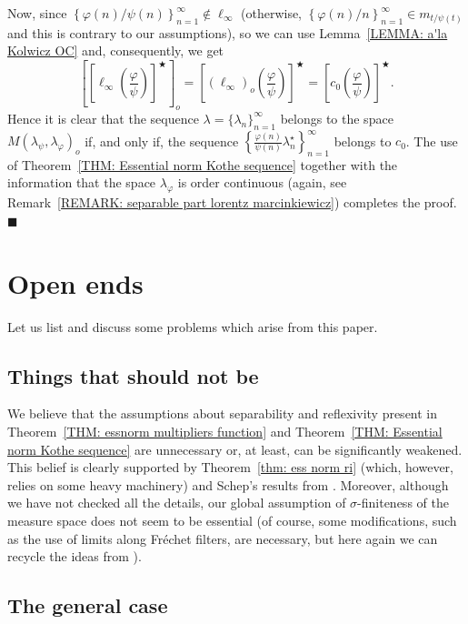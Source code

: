 \documentclass[11pt]{amsart}
\theoremstyle{definition}
\theoremstyle{definition}
\theoremstyle{definition}
\theoremstyle{definition}
\theoremstyle{definition}
\theoremstyle{definition}
\theoremstyle{definition}
\theoremstyle{definition}
\numberwithin{equation}{section}
\numberwithin{equation}{section}
\numberwithin{equation}{section}
\theoremstyle{definition}
\theoremstyle{definition}
\theoremstyle{definition}
\theoremstyle{definition}
\theoremstyle{definition}
\theoremstyle{definition}
\begin{document}
		Now, since $\left\{ \varphi(n)/\psi(n) \right\}_{n=1}^{\infty} \notin \ell_{\infty}$
		(otherwise, $\left\{ \varphi(n)/n \right\}_{n=1}^{\infty} \in m_{t/\psi(t)}$ and this is contrary to our assumptions),
		so we can use Lemma~\ref{LEMMA: a'la Kolwicz OC} and, consequently, we get
		\begin{equation*}
			\left[ \left[ \ell_{\infty}\left( \frac{\varphi}{\psi} \right) \right]^{\bigstar} \right]_o
				= \left[ (\ell_{\infty})_o \left( \frac{\varphi}{\psi} \right) \right]^{\bigstar}
				= \left[ c_0 \left( \frac{\varphi}{\psi} \right) \right]^{\bigstar}.
		\end{equation*}
		Hence it is clear that the sequence $\lambda = \{\lambda_n\}_{n=1}^{\infty}$ belongs to the space $M(\lambda_{\psi}, \lambda_{\varphi})_o$ if, and only if,
		the sequence $\left\{ \frac{\varphi(n)}{\psi(n)} \lambda_n^{\star} \right\}_{n=1}^{\infty}$ belongs to $c_0$. The use of Theorem~\ref{THM: Essential norm Kothe sequence}
		together with the information that the space $\lambda_{\varphi}$ is order continuous (again, see Remark~\ref{REMARK: separable part lorentz marcinkiewicz}) completes the proof.
		\hfill $\blacksquare$
	
\section{{\bf Open ends}} \label{SECTION: Open ends}

Let us list and discuss some problems which arise from this paper.

\subsection{Things that should not be}

We believe that the assumptions about separability and reflexivity present in Theorem~\ref{THM: essnorm multipliers function}
and Theorem~\ref{THM: Essential norm Kothe sequence} are unnecessary or, at least, can be significantly weakened. This belief
is clearly supported by Theorem~\ref{thm: ess norm ri} (which, however, relies on some heavy machinery) and Schep's results from \cite{Sch22}.
Moreover, although we have not checked all the details, our global assumption of $\sigma$-finiteness of the measure space does
not seem to be essential (of course, some modifications, such as the use of limits along Fr{\' e}chet filters, are necessary,
but here again we can recycle the ideas from \cite{Sch22}).

\subsection{The general case}
\end{document}
